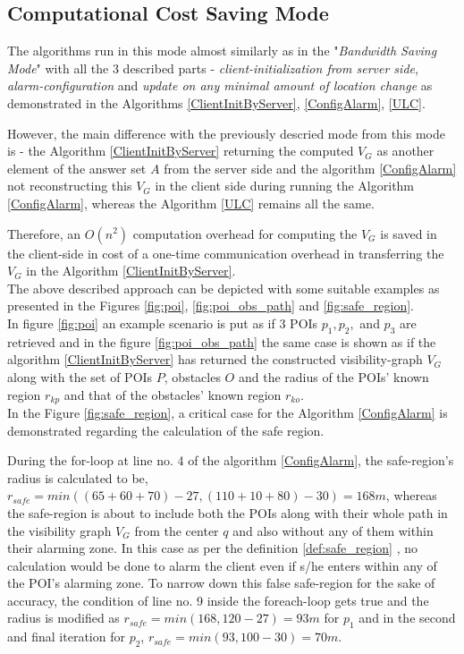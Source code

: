 \documentclass{sig-alternate}
\begin{document}
\subsection{Computational Cost Saving Mode}
The algorithms run in this mode almost similarly as in the "\textit{Bandwidth Saving Mode}" with all the 3 described parts - \textit{client-initialization from server side}, \textit{alarm-configuration} and \textit{update on any minimal amount of location change} as demonstrated in the Algorithms \ref{ClientInitByServer}, \ref{ConfigAlarm}, \ref{ULC}.

However, the main difference with the previously descried mode from this mode is - the Algorithm \ref{ClientInitByServer} returning the computed $V_G$ as another element of the answer set $A$ from the server side and the algorithm \ref{ConfigAlarm} not reconstructing this $V_G$ in the client side during running the Algorithm \ref{ConfigAlarm}, whereas the Algorithm \ref{ULC} remains all the same.

Therefore, an $O(n^2)$ computation overhead for computing the $V_G$ is saved in the client-side in cost of a one-time communication overhead in transferring the $V_G$ in the Algorithm \ref{ClientInitByServer}.\\

The above described approach can be depicted with some suitable examples as presented in the Figures \ref{fig:poi}, \ref{fig:poi_obs_path} and \ref{fig:safe_region}.\\

In figure \ref{fig:poi} an example scenario is put as if 3 POIs $p_1, p_2,$ and $p_3$ are retrieved and in the figure \ref{fig:poi_obs_path} the same case is shown as if the algorithm \ref{ClientInitByServer} has returned the constructed visibility-graph $V_G$ along with the set of POIs $P$, obstacles $O$ and the radius of the POIs' known region $r_{kp}$ and that of the obstacles' known region $r_{ko}$.\\

In the Figure \ref{fig:safe_region}, a critical case for the Algorithm \ref{ConfigAlarm} is demonstrated regarding the calculation of the safe region.

During the for-loop at line no. 4 of the algorithm \ref{ConfigAlarm}, the safe-region's radius is calculated to be,
\\$r_{safe} = min( (65+60+70)-27, (110+10+80)-30 ) = 168m$, whereas the safe-region is about to include both the POIs along with their whole path in the visibility graph $V_G$ from the center $q$ and also without any of them within their alarming zone. In this case as per the definition \ref{def:safe_region} , no calculation would be done to alarm the client even if s/he enters within any of the POI's alarming zone. To narrow down this false safe-region for the sake of accuracy, the condition of line no. 9 inside the foreach-loop gets true and the radius is modified as $r_{safe} = min(168, 120-27) = 93m$ for $p_1$ and in the second and final iteration for $p_2$, $r_{safe} = min( 93, 100-30) = 70m$.
\end{document}
